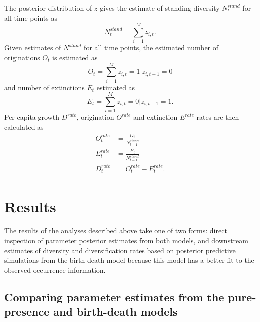 The posterior distribution of \(z\) gives the estimate of standing diversity \(N^{stand}_{t}\) for all time points as 
\begin{equation}
  N^{stand}_{t} = \sum_{i = 1}^{M} z_{i, t}.
  \label{eq:stand_est}
\end{equation}
Given estimates of \(N^{stand}\) for all time points, the estimated number of originations \(O_{t}\) is estimated as 
\begin{equation}
  O_t = \sum_{i = 1}^{M} z_{i, t} = 1 | z_{i, t - 1} = 0
  \label{eq:orig_est}
\end{equation}
and number of extinctions \(E_{t}\) estimated as
\begin{equation}
  E_{t} = \sum_{i = 1}^{M} z_{i, t} = 0 | z_{i, t - 1} = 1.
  \label{eq:death_est}
\end{equation}
Per-capita growth \(D^{rate}\), origination \(O^{rate}\) and extinction \(E^{rate}\) rates are then calculated as
\begin{equation}
  \begin{aligned}
    O^{rate}_{t} &= \frac{O_t}{N^{stand}_{t - 1}} \\
    E^{rate}_{t} &= \frac{E_t}{N^{stand}_{t - 1}} \\
    D^{rate}_{t} &= O^{rate}_{t} - E^{rate}_{t}. \\
  \end{aligned}
  \label{eq:per_capita_est}
\end{equation}


\section*{Results}

The results of the analyses described above take one of two forms: direct inspection of parameter posterior estimates from both models, and downstream estimates of diversity and diversification rates based on posterior predictive simulations from the birth-death model because this model has a better fit to the observed occurrence information.

\subsection*{Comparing parameter estimates from the pure-presence and birth-death models}

